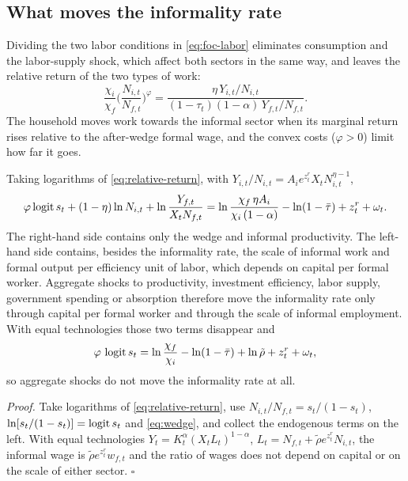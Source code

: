 \subsection{What moves the informality rate}

Dividing the two labor conditions in \eqref{eq:foc-labor} eliminates consumption and the labor-supply shock, which affect both sectors in the same way, and leaves the relative return of the two types of work:
\begin{equation}
\frac{\chi_i}{\chi_f}\Big(\frac{N_{i,t}}{N_{f,t}}\Big)^{\varphi} = \frac{\eta\,Y_{i,t}/N_{i,t}}{(1-\tau_t)(1-\alpha)\,Y_{f,t}/N_{f,t}} .
\label{eq:relative-return}
\end{equation}
The household moves work towards the informal sector when its marginal return rises relative to the after-wedge formal wage, and the convex costs ($\varphi>0$) limit how far it goes.

\begin{proposition}
\label{prop:rate}
Taking logarithms of \eqref{eq:relative-return}, with $Y_{i,t}/N_{i,t} = A_ie^{z^r_t}X_tN_{i,t}^{\eta-1}$,
\begin{equation}
\varphi\operatorname{logit} s_t + (1-\eta)\ln N_{i,t} + \ln\frac{Y_{f,t}}{X_tN_{f,t}}
= \ln\frac{\chi_f\,\eta A_i}{\chi_i\,(1-\alpha)} - \ln(1-\bar\tau) + z^r_t + \omega_t .
\label{eq:rate-labor-only}
\end{equation}
The right-hand side contains only the wedge and informal productivity. The left-hand side contains, besides the informality rate, the scale of informal work and formal output per efficiency unit of labor, which depends on capital per formal worker. Aggregate shocks to productivity, investment efficiency, labor supply, government spending or absorption therefore move the informality rate only through capital per formal worker and through the scale of informal employment. With equal technologies those two terms disappear and
\begin{equation}
\varphi\,\operatorname{logit} s_t = \ln\frac{\chi_f}{\chi_i} - \ln(1-\bar\tau) + \ln\tilde\rho + z^r_t + \omega_t ,
\label{eq:rate}
\end{equation}
so aggregate shocks do not move the informality rate at all.
\end{proposition}

\emph{Proof.} Take logarithms of \eqref{eq:relative-return}, use $N_{i,t}/N_{f,t} = s_t/(1-s_t)$, $\ln[s_t/(1-s_t)]=\operatorname{logit} s_t$ and \eqref{eq:wedge}, and collect the endogenous terms on the left. With equal technologies $Y_t=K_t^{\alpha}(X_tL_t)^{1-\alpha}$, $L_t = N_{f,t}+\tilde\rho e^{z^r_t}N_{i,t}$, the informal wage is $\tilde\rho e^{z^r_t}w_{f,t}$ and the ratio of wages does not depend on capital or on the scale of either sector. $\square$

